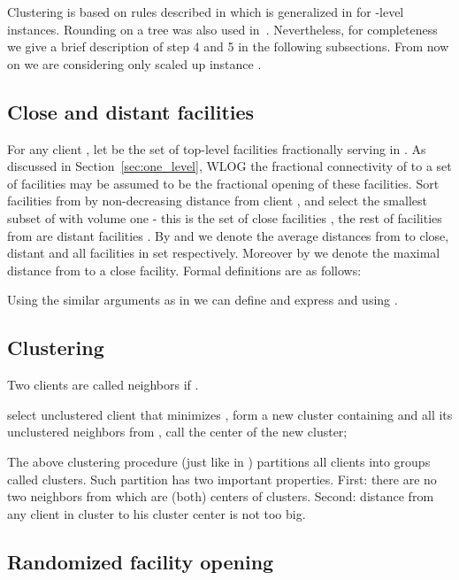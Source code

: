 \documentclass{llncs}
\begin{document}
Clustering is based on rules described in \cite{Chudak} which is generalized in \cite{Rybicki} for -level instances.
Rounding on a tree was also used in~\cite{Rybicki}. Nevertheless, for completeness we give a brief description of step 4 and 5 in the following subsections.
From now on we are considering only scaled up instance .

\subsection{Close and distant facilities}

For any client , let  be the set of top-level facilities fractionally serving  in .
As discussed in Section~\ref{sec:one_level}, WLOG the fractional connectivity of  to a set of facilities may be assumed to be
the fractional opening of these facilities.
Sort facilities  {from}  by non-decreasing distance from client ,
and select the smallest subset of  with volume one - this is the set of close facilities ,
the rest of facilities {from}  are distant facilities .
By  and  we denote the average distances from  to close, distant and all facilities in set  {respectively}.
Moreover by  we denote the maximal distance from  to a close facility. Formal definitions are as follows:


Using the similar arguments as in \cite{Ghodsi} we can define  and express  and  using . 

\subsection{Clustering}

Two clients  are called neighbors if .
\begin{algorithmic}[1]
  \STATE select unclustered client  that minimizes ,
  \STATE form a new cluster containing  and all its unclustered neighbors from ,
  \STATE call  the center of the new cluster;
 \ENDWHILE
\end{algorithmic}

The above clustering procedure (just like in \cite{Chudak}) partitions all clients into groups called clusters. Such partition has two important properties.
First: there are no two neighbors from  which are (both) centers of clusters.
Second: distance from any client in cluster to his cluster center is not too big.

\subsection{Randomized facility opening}
\end{document}

